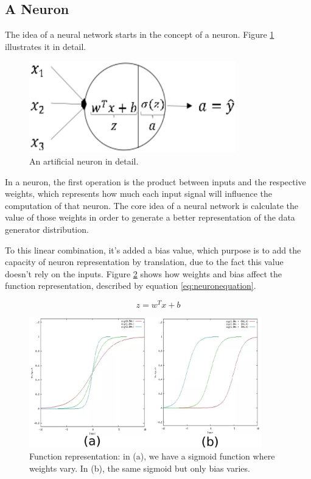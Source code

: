 \subsection{A Neuron}\label{sec:neuron}

The idea of a neural network starts in the concept of a neuron. Figure \ref{fig:neurondetail} illustrates it in detail.

\begin{figure}[!htbp]
	\centering
	\includegraphics[width=0.8\textwidth]{Cap3/neurondetail.eps}
	\caption{An artificial neuron in detail.}
	\label{fig:neurondetail}
\end{figure}

In a neuron, the first operation is the product between inputs and the respective weights, which represents how much each input signal will influence the computation of that neuron. The core idea of a neural network is calculate the value of those weights in order to generate a better representation of the data generator distribution.

To this linear combination, it's added a bias value, which purpose is to add the capacity of neuron representation by translation, due to the fact this value doesn't rely on the inputs. Figure \ref{fig:bias} shows how weights and bias affect the function representation, described by equation \ref{eq:neuronequation}.


\begin{equation}
z = w^{T}x + b
\label{eq:neuronequation}
\end{equation}



\begin{figure}[!htbp]
	\centering
	\includegraphics[width=0.9\textwidth]{Cap3/bias.eps}
	\caption{Function representation: in (a), we have a sigmoid function where weights vary. In (b), the same sigmoid but only bias varies.}
	\label{fig:bias}
\end{figure}

